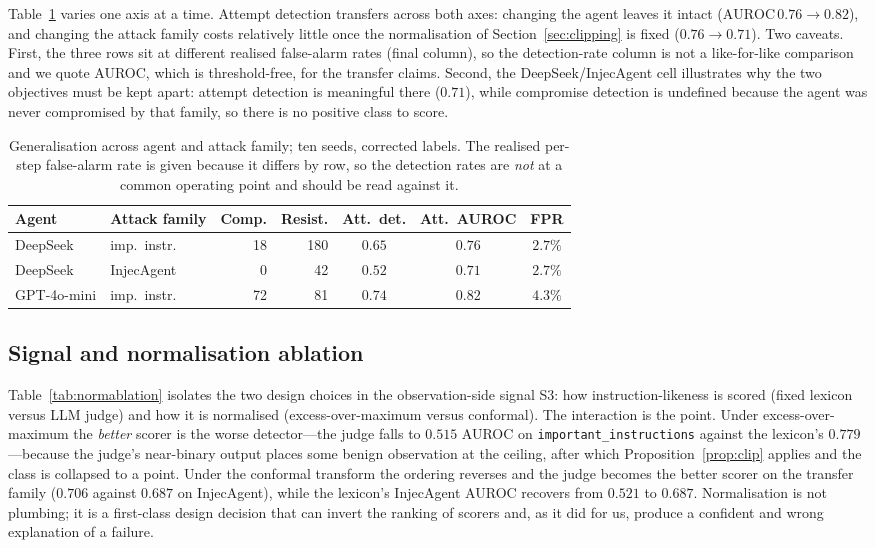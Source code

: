 \documentclass[preprint,12pt,number]{elsarticle}
\theoremstyle{definition}
\begin{document}
Table~\ref{tab:generalisation} varies one axis at a time. Attempt detection
transfers across both axes: changing the agent leaves it intact
($\mathrm{AUROC}\,0.76 \to 0.82$), and changing the attack family costs
relatively little once the normalisation of Section~\ref{sec:clipping} is fixed
($0.76 \to 0.71$). Two caveats. First, the three rows sit at different realised
false-alarm rates (final column), so the detection-rate column is not a
like-for-like comparison and we quote AUROC, which is threshold-free, for the
transfer claims. Second, the DeepSeek/InjecAgent cell illustrates why the two
objectives must be kept apart: attempt detection is meaningful there ($0.71$),
while compromise detection is undefined because the agent was never compromised by
that family, so there is no positive class to score.

\begin{table}[t]
\centering
\caption{Generalisation across agent and attack family; ten seeds, corrected
labels. The realised per-step false-alarm rate is given because it differs by row,
so the detection rates are \emph{not} at a common operating point and should be
read against it.}
\label{tab:generalisation}
\small
\setlength{\tabcolsep}{4pt}
\begin{tabular}{@{}llrrccc@{}}
\toprule
Agent & Attack family & Comp. & Resist. & Att.\ det. & Att.\ AUROC & FPR \\
\midrule
DeepSeek & imp.\ instr. & 18 & 180 & $0.65$ & $0.76$ & $2.7\%$ \\
DeepSeek & InjecAgent & 0 & 42 & $0.52$ & $0.71$ & $2.7\%$ \\
GPT-4o-mini & imp.\ instr. & 72 & 81 & $0.74$ & $0.82$ & $4.3\%$ \\
\bottomrule
\end{tabular}
\end{table}

\subsection{Signal and normalisation ablation}\label{sec:ablation}

Table~\ref{tab:normablation} isolates the two design choices in the
observation-side signal S3: how instruction-likeness is scored (fixed lexicon
versus LLM judge) and how it is normalised (excess-over-maximum versus conformal).
The interaction is the point. Under excess-over-maximum the \emph{better} scorer is
the worse detector---the judge falls to $0.515$ AUROC on
\texttt{important\_instructions} against the lexicon's $0.779$---because the
judge's near-binary output places some benign observation at the ceiling, after
which Proposition~\ref{prop:clip} applies and the class is collapsed to a point.
Under the conformal transform the ordering reverses and the judge becomes the
better scorer on the transfer family ($0.706$ against $0.687$ on InjecAgent), while
the lexicon's InjecAgent AUROC recovers from $0.521$ to $0.687$. Normalisation is
not plumbing; it is a first-class design decision that can invert the ranking of
scorers and, as it did for us, produce a confident and wrong explanation of a
failure.
\end{document}
